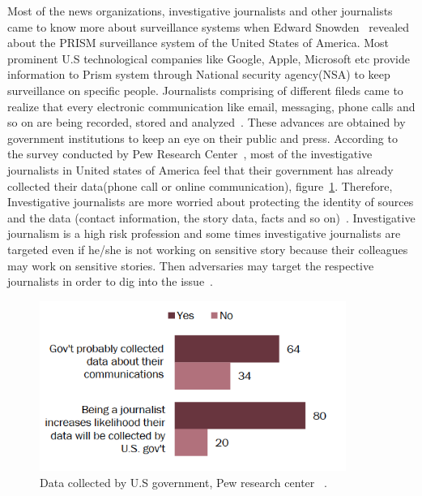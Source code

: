 Most of the news organizations, investigative journalists and other journalists came to know more about surveillance systems when Edward Snowden ~\cite{si4}revealed about the PRISM surveillance system of the United States of America. Most prominent U.S technological companies like Google, Apple, Microsoft etc provide information to Prism system through National security agency(NSA) to keep surveillance on specific people. Journalists comprising of different fileds came to realize that every electronic communication like email, messaging, phone calls and so on are being recorded, stored and analyzed~\cite{si4}. These advances are obtained by government institutions to keep an eye on their public and press. According to the survey conducted by Pew Research Center~\cite{ia2p}, most of the investigative journalists in United states of America feel that their government has already collected their data(phone call or online communication), figure~\ref{fig:2}. Therefore,  Investigative journalists are more worried about protecting the identity of sources and the data (contact information, the story  data, facts and so on)~\cite{wm4}. Investigative journalism is a high risk profession  and some times investigative journalists are targeted even if he/she is not working on sensitive story because their colleagues may work on sensitive stories. Then adversaries may target the respective journalists in order to dig into the issue~\cite{si4}.\\
 \begin{figure}[ht!]
 	\centering
 	\includegraphics[width=100mm]{3.png}
 	\caption{Data collected by U.S government, Pew research center ~\cite{ia2p}.}
 	\label{fig:2}
 \end{figure}

